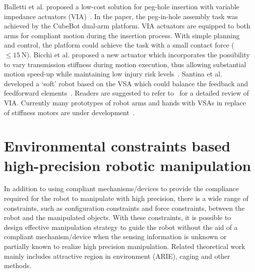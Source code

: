 \documentclass[journal,twoside,web]{ieeecolor}
\begin{document}
Balletti et al. proposed a low-cost solution for peg-hole insertion with variable impedance actuators (VIA)~\cite{Balletti2012}. In the paper, the peg-in-hole assembly task was achieved by the CubeBot dual-arm platform. VIA actuators are equipped to both arms for compliant motion during the insertion process. With simple planning and control, the platform could achieve the task with a small contact force ($\le \SI{15}{\newton}$).
Bicchi et al. proposed a new actuator which incorporates the possibility to vary transmission stiffness during motion execution, thus allowing substantial motion speed-up while maintaining low injury risk levels~\cite{Bicchi2005}.
Santina et al. developed a `soft' robot based on the VSA which could balance the feedback and feedforward elements~\cite{Della2017}.
Readers are suggested to refer to~\cite{Wolf2016} for a detailed review of VIA.
Currently many prototypes of robot arms and hands with VSAs in replace of stiffness motors are under development~\cite{Zheng2016,Rice2018,Haas2018}.

\section{Environmental constraints based high-precision robotic manipulation}
\label{sec:compliant_env}

In addition to using compliant mechanisms/devices to provide the compliance required for the robot to manipulate with high precision, there is a wide range of constraints, such as configuration constraints and force constraints, between the robot and the manipulated objects. 
With these constraints, it is possible to design effective manipulation strategy to guide the robot without the aid of a compliant mechanism/device when the sensing information is unknown or partially known to realize high precision manipulation. 
Related theoretical work mainly includes attractive region in environment (ARIE), caging and other methods.

\end{document}
